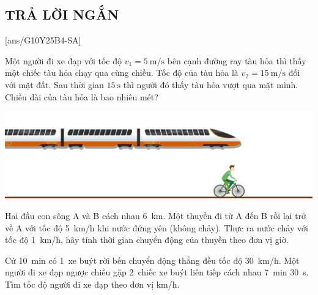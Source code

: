 \subsection{TRẢ LỜI NGẮN}
\setcounter{ex}{0}
[ans/G10Y25B4-SA]
\begin{ex}
	Một người đi xe đạp với tốc độ $v_1=\SI{5}{\meter/\second}$ bên cạnh đường ray tàu hỏa thì thấy một chiếc tàu hỏa chạy qua cùng chiều. Tốc độ của tàu hỏa là $v_2=\SI{15}{\meter/\second}$ đối với mặt đất. Sau thời gian $\SI{15}{\second}$ thì người đó thấy tàu hỏa vượt qua mặt mình. Chiều dài của tàu hỏa là bao nhiêu mét?
	\begin{center}
		\includegraphics[scale=0.5]{figs/G10Y25B4-6}
	\end{center}
\end{ex}
\begin{ex}
	Hai đầu con sông A và B cách nhau \SI{6}{\kilo\meter}. Một thuyền đi từ A đến B rồi lại trở về A với tốc độ \SI{5}{\kilo\meter/\hour} khi nước đứng yên (không chảy). Thực ra nước chảy với tốc độ \SI{1}{\kilo\meter/\hour}, hãy tính thời gian chuyển động của thuyền theo đơn vị giờ.
\end{ex}

\begin{ex}
	Cứ \SI{10}{\minute} có \SI{1}{xe} buýt rời bến chuyển động thẳng đều tốc độ \SI{30}{\kilo\meter/h}. Một người đi xe đạp ngược chiều gặp \SI{2}{chiếc} xe buýt liên tiếp cách nhau \SI{7}{\minute} \SI{30}{\second}. Tìm tốc độ người đi xe đạp theo đơn vị \si{\kilo\meter/\hour}.
\end{ex}

